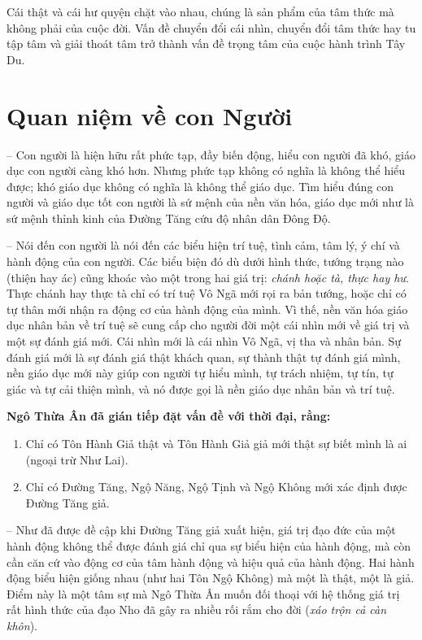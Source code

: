 Cái thật và cái hư quyện chặt vào nhau, chúng là sản phẩm của tâm thức mà không phải của cuộc đời. Vấn đề chuyển đổi cái nhìn, chuyển đổi tâm thức hay tu tập tâm và giải thoát tâm trở thành vấn đề trọng tâm của cuộc hành trình Tây Du.

\section{Quan niệm về con Người} %
\label{sec:56_57_con_nguoi}

-- Con người là hiện hữu rất phức tạp, đầy biến động, hiểu con người đã khó, giáo dục con người càng khó hơn. Nhưng phức tạp không có nghĩa là không thể hiểu được; khó giáo dục không có nghĩa là không thể giáo dục. Tìm hiểu đúng con người và giáo dục tốt con người là sứ mệnh của nền văn hóa, giáo dục mới như là sứ mệnh thỉnh kinh của Đường Tăng cứu độ nhân dân Đông Độ.

-- Nói đến con người là nói đến các biểu hiện trí tuệ, tình cảm, tâm lý, ý chí và hành động của con người. Các biểu biện đó dù dưới hình thức, tướng trạng nào (thiện hay ác) cũng khoác vào một trong hai giá trị: \emph{chánh hoặc tà, thực hay hư}. Thực chánh hay thực tà chỉ có trí tuệ Vô Ngã mới rọi ra bản tướng, hoặc chỉ có tự thân mới nhận ra động cơ của hành động của mình. Vì thế, nền văn hóa giáo dục nhân bản về trí tuệ sẽ cung cấp cho người đời một cái nhìn mới về giá trị và một sự đánh giá mới. Cái nhìn mới là cái nhìn Vô Ngã, vị tha và nhân bản. Sự đánh giá mới là sự đánh giá thật khách quan, sự thành thật tự đánh giá mình, nền giáo dục mới này giúp con người tự hiểu mình, tự trách nhiệm, tự tín, tự giác và tự cải thiện mình, và nó được gọi là nền giáo dục nhân bản và trí tuệ.

{\bf Ngô Thừa Ân đã gián tiếp đặt vấn đề với thời đại, rằng:}

\begin{enumerate}[label=\itshape\alph*\upshape/]
    \item Chỉ có Tôn Hành Giả thật và Tôn Hành Giả giả mới thật sự biết mình là ai (ngoại trừ Như Lai).

    \item Chỉ có Đường Tăng, Ngộ Năng, Ngộ Tịnh và Ngộ Không mới xác định được Đường Tăng giả.
\end{enumerate}

-- Như đã được đề cập khi Đường Tăng giả xuất hiện, giá trị đạo đức của một hành động không thể được đánh giá chỉ qua sự biểu hiện của hành động, mà còn cần căn cứ vào động cơ của tâm hành động và hiệu quả của hành động. Hai hành động biểu hiện giống nhau (như hai Tôn Ngộ Không) mà một là thật, một là giả. Điểm này là một tâm sự mà Ngô Thừa Ân muốn đối thoại với hệ thống giá trị rất hình thức của đạo Nho đã gây ra nhiều rối rắm cho đời (\emph{xáo trộn cả càn khôn}).

